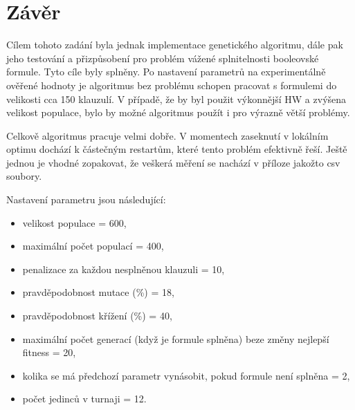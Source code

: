 \documentclass[a4paper]{article}
\begin{document}
\section{Závěr}
	Cílem tohoto zadání byla jednak implementace genetického algoritmu, dále pak jeho testování a přizpůsobení pro problém vážené splnitelnosti booleovské formule. Tyto cíle byly splněny. Po nastavení parametrů na experimentálně ověřené hodnoty je algoritmus bez problému schopen pracovat s formulemi do velikosti cca 150 klauzulí. V případě, že by byl použit výkonnější HW a zvýšena velikost populace, bylo by možné algoritmus použít i pro výrazně větší problémy.
	
	Celkově algoritmus pracuje velmi dobře. V momentech zaseknutí v lokálním optimu dochází k částečným restartům, které tento problém efektivně řeší. Ještě jednou je vhodné zopakovat, že veškerá měření se nachází v příloze jakožto csv soubory.
	
	Nastavení parametru jsou následující:
	\begin{itemize}
			\item velikost populace = 600,
			\item maximální počet populací = 400,
			\item penalizace za každou nesplněnou klauzuli = 10,
			\item pravděpodobnost mutace (\%) = 18,
			\item pravděpodobnost křížení (\%) = 40,
			\item maximální počet generací (když je formule splněna) beze změny nejlepší fitness = 20,
			\item kolika se má předchozí parametr vynásobit, pokud formule není splněna = 2,
			\item počet jedinců v turnaji = 12.
	\end{itemize}
\end{document}
